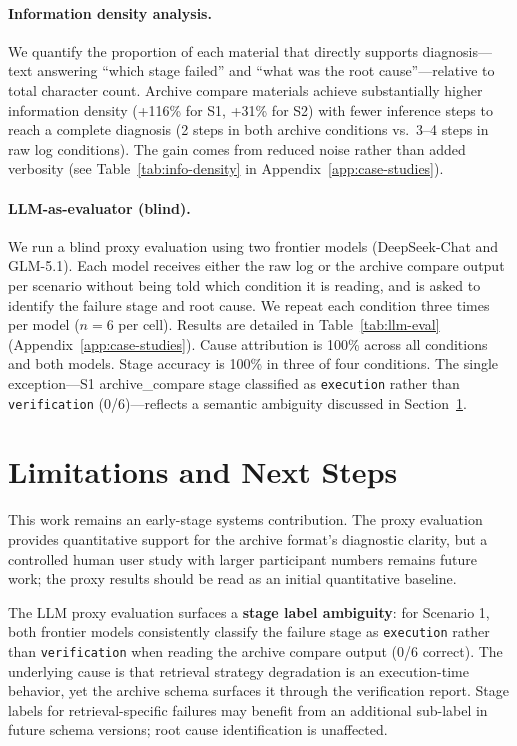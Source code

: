 \documentclass[11pt]{article}
\begin{document}
\paragraph{Information density analysis.}
We quantify the proportion of each material that directly supports diagnosis---text answering ``which stage failed'' and ``what was the root cause''---relative to total character count. Archive compare materials achieve substantially higher information density (+116\% for S1, +31\% for S2) with fewer inference steps to reach a complete diagnosis (2 steps in both archive conditions vs.\ 3--4 steps in raw log conditions). The gain comes from reduced noise rather than added verbosity (see Table~\ref{tab:info-density} in Appendix~\ref{app:case-studies}).

\paragraph{LLM-as-evaluator (blind).}
We run a blind proxy evaluation using two frontier models (DeepSeek-Chat and GLM-5.1). Each model receives either the raw log or the archive compare output per scenario without being told which condition it is reading, and is asked to identify the failure stage and root cause. We repeat each condition three times per model ($n{=}6$ per cell). Results are detailed in Table~\ref{tab:llm-eval} (Appendix~\ref{app:case-studies}). Cause attribution is 100\% across all conditions and both models. Stage accuracy is 100\% in three of four conditions. The single exception---S1 archive\_compare stage classified as \texttt{execution} rather than \texttt{verification} (0/6)---reflects a semantic ambiguity discussed in Section~\ref{sec:limitations}.

\section{Limitations and Next Steps}
\label{sec:limitations}

This work remains an early-stage systems contribution. The proxy evaluation provides quantitative support for the archive format's diagnostic clarity, but a controlled human user study with larger participant numbers remains future work; the proxy results should be read as an initial quantitative baseline.

The LLM proxy evaluation surfaces a \textbf{stage label ambiguity}: for Scenario 1, both frontier models consistently classify the failure stage as \texttt{execution} rather than \texttt{verification} when reading the archive compare output (0/6 correct). The underlying cause is that retrieval strategy degradation is an execution-time behavior, yet the archive schema surfaces it through the verification report. Stage labels for retrieval-specific failures may benefit from an additional sub-label in future schema versions; root cause identification is unaffected.
\end{document}
